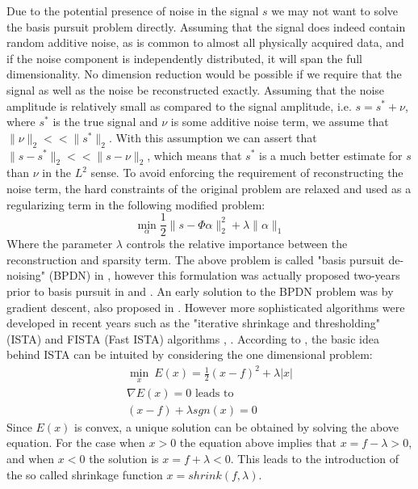\documentclass[12pt,a4paper]{article}
\begin{document}
Due to the potential presence of noise in the signal $s$ we may not want to solve the basis pursuit problem directly. Assuming that the signal does indeed contain random additive noise, as is common to almost all physically acquired data, and if the noise component is independently distributed, it will span the full dimensionality. No dimension reduction would be possible if we require that the signal as well as the noise be reconstructed exactly. Assuming that the noise amplitude is relatively small as compared to the signal amplitude, i.e. $s = s^* + \nu$, where $s^*$ is the true signal and $\nu$ is some additive noise term, we assume that $\|\nu\|_2 << \|s^*\|_2$. With this assumption we can assert that $\|s-s^*\|_2 << \|s-\nu\|_2$, which means that $s^*$ is a much better estimate for $s$ than $\nu$ in the $L^2$ sense. To avoid enforcing the requirement of reconstructing the noise term, the hard constraints of the original problem are relaxed and used as a regularizing term in the following modified problem:   \\
\begin{equation}
\min_{\alpha} \frac{1}{2} \|s - \Phi \alpha \|_2 ^2 + \lambda \| \alpha \|_1
\end{equation} 
Where the parameter $\lambda$ controls the relative importance between the reconstruction and sparsity term. The above problem is called "basis pursuit de-noising" (BPDN) in \cite{BasisPursuit}, however this formulation was actually proposed two-years prior to basis pursuit in \cite{Lasso} and \cite{Sparse Coding}. An early solution to the BPDN problem was by gradient descent, also proposed in \cite{Sparse Coding}. However more sophisticated algorithms were developed in recent years such as the "iterative shrinkage and thresholding" (ISTA) and FISTA (Fast ISTA) algorithms \cite{ISTA}, \cite{FISTA}. According to \cite{Osher}, the basic idea behind ISTA can be intuited by considering the one dimensional problem: 
\begin{eqnarray}
\nonumber
\min_x~ E(x)  =  \frac{1}{2}(x - f)^2 + \lambda|x| \\
\nonumber 
\nabla E(x) = 0 \mbox{ leads to }\\
\nonumber 
(x-f) + \lambda sgn(x) = 0
\end{eqnarray}
Since $E(x)$ is convex, a unique solution can be obtained by solving the above equation. For the case when $x>0$ the equation above implies that $x = f - \lambda > 0$, and when $x<0$ the solution is $x=f+\lambda<0$. This leads to the introduction of the so called shrinkage function $x = shrink(f,\lambda)$.  
\end{document}
